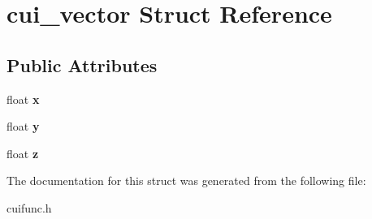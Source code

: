 \hypertarget{structcui__vector}{\section{cui\-\_\-vector Struct Reference}
\label{structcui__vector}
}
\subsection*{Public Attributes}
\begin{DoxyCompactItemize}
\item 
\hypertarget{structcui__vector_aed5e90082265c31e589d37161cbfa8c0}{float {\bfseries x}}\label{structcui__vector_aed5e90082265c31e589d37161cbfa8c0}

\item 
\hypertarget{structcui__vector_a7c4b91cb082221533e9b4b208804885a}{float {\bfseries y}}\label{structcui__vector_a7c4b91cb082221533e9b4b208804885a}

\item 
\hypertarget{structcui__vector_ac23536c13778e3c4b0d20baea0f975ec}{float {\bfseries z}}\label{structcui__vector_ac23536c13778e3c4b0d20baea0f975ec}

\end{DoxyCompactItemize}


The documentation for this struct was generated from the following file\-:\begin{DoxyCompactItemize}
\item 
cuifunc.\-h\end{DoxyCompactItemize}
